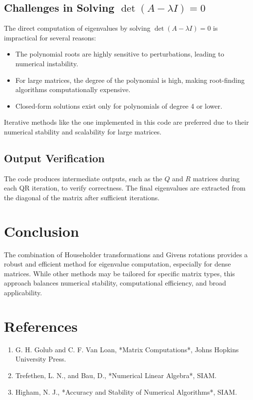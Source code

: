 \documentclass[12pt]{article}
\begin{document}
\subsection{Challenges in Solving \( \det(A - \lambda I) = 0 \)}

The direct computation of eigenvalues by solving \( \det(A - \lambda I) = 0 \) is impractical for several reasons:
\begin{itemize}
    \item The polynomial roots are highly sensitive to perturbations, leading to numerical instability.
    \item For large matrices, the degree of the polynomial is high, making root-finding algorithms computationally expensive.
    \item Closed-form solutions exist only for polynomials of degree 4 or lower.
\end{itemize}

Iterative methods like the one implemented in this code are preferred due to their numerical stability and scalability for large matrices.

\subsection{Output Verification}

The code produces intermediate outputs, such as the \( Q \) and \( R \) matrices during each QR iteration, to verify correctness. The final eigenvalues are extracted from the diagonal of the matrix after sufficient iterations.


\section*{Conclusion}
The combination of Householder transformations and Givens rotations provides a robust and efficient method for eigenvalue computation, especially for dense matrices. While other methods may be tailored for specific matrix types, this approach balances numerical stability, computational efficiency, and broad applicability.

\section*{References}
\begin{enumerate}
    \item G. H. Golub and C. F. Van Loan, *Matrix Computations*, Johns Hopkins University Press.
    \item Trefethen, L. N., and Bau, D., *Numerical Linear Algebra*, SIAM.
    \item Higham, N. J., *Accuracy and Stability of Numerical Algorithms*, SIAM.
\end{enumerate}
\end{document}
